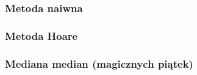 \documentclass[../search-algorithms.tex]{subfiles}
\begin{document}
    \subsubsection{Metoda naiwna}
    \subsubsection{Metoda Hoare}
    \subsubsection{Mediana median (magicznych piątek)}
    \pagebreak
\end{document}
